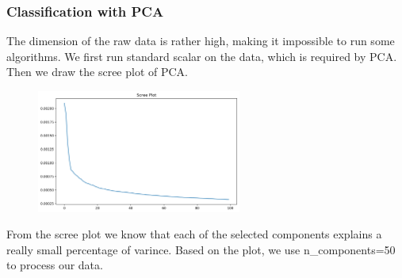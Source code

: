 \documentclass[12pt]{article}
\begin{document}
\subsubsection{Classification with PCA}
The dimension of the raw data is rather high, making it impossible to run some algorithms. We first run standard scalar on the data, which is required by PCA. Then we draw the scree plot of PCA.
\begin{figure}[H]
\begin{center}
    \includegraphics[width=0.6\textwidth]{../05_dataMining/ScreePlot.png}
\end{center}
\end{figure}
From the scree plot we know that each of the selected components explains a really small percentage of varince. Based on the plot, we use n\_components=50 to process our data.
\end{document}
